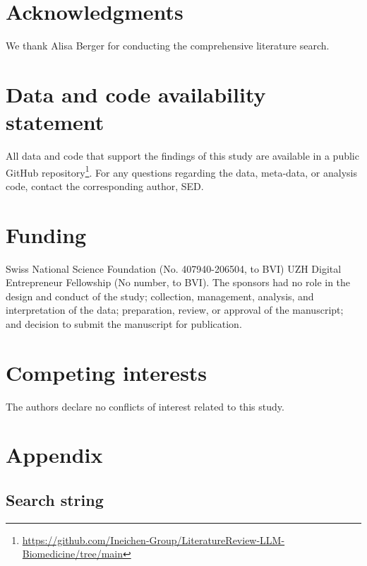 \documentclass[fleqn,10pt]{olplainarticle}
\begin{document}
\section*{Acknowledgments}
We thank Alisa Berger for conducting the comprehensive literature search.

\section*{Data and code availability statement}
All data and code that support the findings of this study are available in a public GitHub repository\footnote{\url{https://github.com/Ineichen-Group/LiteratureReview-LLM-Biomedicine/tree/main}}. For any questions regarding the data, meta-data, or analysis code, contact the corresponding author, SED.

\section*{Funding}
Swiss National Science Foundation (No. 407940-206504, to BVI)
UZH Digital Entrepreneur Fellowship (No number, to BVI).
The sponsors had no role in the design and conduct of the study; collection, management, analysis, and interpretation of the data; preparation, review, or approval of the manuscript; and decision to submit the manuscript for publication.

\section*{Competing interests}
The authors declare no conflicts of interest related to this study.




\section*{Appendix}

\subsection*{Search string}
\end{document}
